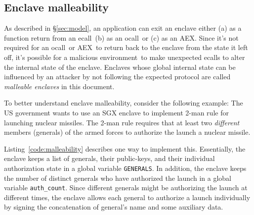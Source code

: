 \documentclass[letterpaper]{article}
\newcommand{\secref}[1]{\S\ref{#1}}
\newcommand{\ecall}{\textsf{ecall}}
\newcommand{\ocall}{\textsf{ocall}}
\newcommand{\aex}{\textsf{AEX}}
\newcommand{\env}{\textsf{environment}}
\begin{document}
  \subsection{Enclave malleability}
  \label{ssec:malleability}
  As described in \secref{sec:model}, an application can exit an
  enclave either (a) as a function return from an \ecall\ (b) as an
  \ocall\ or (c) as an \aex. Since it's not required for an \ocall\ or
  \aex\ to return back to the enclave from the state it left off, it's
  possible for a malicious \env\ to make unexpected \ecall s to alter
  the internal state of the enclave. Enclaves whose global internal
  state can be influenced by an attacker by not following the expected
  protocol are called \textit{malleable enclaves} in this document.

  To better understand enclave malleability, consider the following
  example: The US government wants to use an SGX enclave to implement
  2-man rule for launching nuclear missiles. The 2-man rule requires
  that at least two \textit{different} members (generals) of the armed
  forces to authorize the launch a nuclear missile.

  Listing~\ref{code:malleability} describes one way to implement this.
  Essentially, the enclave keeps a list of generals, their
  public-keys, and their individual authorization state in a global
  variable \texttt{GENERALS}. In addition, the enclave keeps the
  number of distinct generals who have authorized the launch in a
  global variable \texttt{auth\_count}. Since different generals might
  be authorizing the launch at different times, the enclave allows
  each general to authorize a launch individually by signing the
  concatenation of general's name and some auxiliary data.
\end{document}

